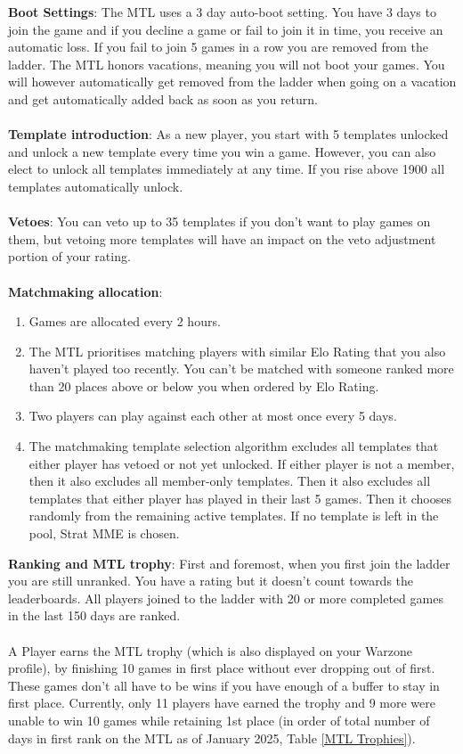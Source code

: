 \textbf{Boot Settings}: The MTL uses a 3 day auto-boot setting. You have 3 days to join the game and if you decline a game or fail to join it in time, you receive an automatic loss. If you fail to join 5 games in a row you are removed from the ladder. The MTL honors vacations, meaning you will not boot your games. You will however automatically get removed from the ladder when going on a vacation and get automatically added back as soon as you return.
\\
\\
\textbf{Template introduction}: As a new player, you start with 5 templates unlocked and unlock a new template every time you win a game. However, you can also elect to unlock all templates immediately at any time. If you rise above 1900 all templates automatically unlock. 
\\
\\
\textbf{Vetoes}: You can veto up to 35 templates if you don't want to play games on them, but vetoing more templates will have an impact on the veto adjustment portion of your rating. 
\\
\\
\textbf{Matchmaking allocation}: 
\begin{enumerate}
    \item Games are allocated every 2 hours.
    \item The MTL prioritises matching players with similar Elo Rating that you also haven't played too recently. You can't be matched with someone ranked more than 20 places above or below you when ordered by Elo Rating.
    \item Two players can play against each other at most once every 5 days.
    \item The matchmaking template selection algorithm excludes all templates that either player has vetoed or not yet unlocked. If either player is not a member, then it also excludes all member-only templates. Then it also excludes all templates that either player has played in their last 5 games. Then it chooses randomly from the remaining active templates. If no template is left in the pool, Strat MME is chosen.
\end{enumerate} 

\textbf{Ranking and MTL trophy}: First and foremost, when you first join the ladder you are still unranked. You have a rating but it doesn't count towards the leaderboards. All players joined to the ladder with 20 or more completed games in the last 150 days are ranked.
\\
\\
A Player earns the MTL trophy (which is also displayed on your Warzone profile), by finishing 10 games in first place without ever dropping out of first. These games don't all have to be wins if you have enough of a buffer to stay in first place. Currently, only 11 players have earned the trophy and 9 more were unable to win 10 games while retaining 1st place (in order of total number of days in first rank on the MTL as of January 2025, Table \ref{MTL Trophies}).

